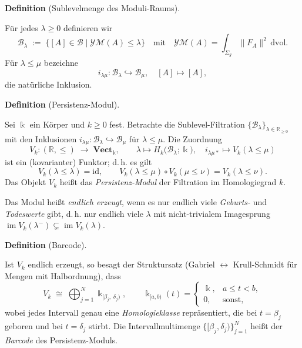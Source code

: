 \documentclass[10pt, letterpaper]{article}
\newcommand{\CustomHeading}[3]{%
  \par\medskip\noindent%
  \textbf{#1 #2} \textnormal{(#3)}.\enskip%
}
\newenvironment{DEF}[2]{\CustomHeading{Definition}{#1}{#2}}{}
\begin{document}
\begin{DEF}{}{Sublevelmenge des Moduli-Raums}
Für jedes \(\lambda\ge 0\) definieren wir
\[
  \mathcal B_\lambda
    \;:=\;
    \bigl\{[A]\in\mathcal B
      \mid
      \mathcal{YM}(A)\le\lambda
    \bigr\}
  \quad\text{mit}\quad
  \mathcal{YM}(A)
  =\int_{\Sigma_g}\!\|F_A\|^2\,\mathrm d\mathrm{vol}.
\]
Für \(\lambda\le\mu\) bezeichne
\[
  i_{\lambda\mu}\colon
    \mathcal B_\lambda\hookrightarrow\mathcal B_\mu,
  \quad
  [A]\mapsto[A],
\]
die natürliche Inklusion.
\end{DEF}


\begin{DEF}{}{Persistenz-Modul}
Sei $\Bbbk$ ein Körper und \(k\ge 0\) fest.  
Betrachte die Sublevel-Filtration \(\{\mathcal B_\lambda\}_{\lambda\in\mathbb R_{\ge0}}\) mit den Inklusionen
\(i_{\lambda\mu}\colon\mathcal B_\lambda\hookrightarrow\mathcal B_\mu\) für \(\lambda\le\mu\). Die Zuordnung
\[
  V_k\colon(\mathbb R,\le)\;\longrightarrow\;\mathbf{Vect}_{\Bbbk},
  \qquad
  \lambda\longmapsto H_k\!\bigl(\mathcal B_\lambda;\Bbbk\bigr), 
  \quad
  i_{\lambda\mu*}\longmapsto V_k(\lambda\le\mu)
\]
ist ein (kovarianter) Funktor; d.\,h. es gilt
\[
  V_k(\lambda\le\lambda)=\mathrm{id},
  \qquad
  V_k(\lambda\le\mu)\circ V_k(\mu\le\nu)=V_k(\lambda\le\nu).
\]
Das Objekt \(V_k\) heißt das \emph{Persistenz-Modul} der Filtration im Homologiegrad \(k\).

Das Modul heißt \emph{endlich erzeugt}, wenn es nur endlich viele \emph{Geburts-} und \emph{Todeswerte} gibt, d.\,h. nur endlich viele \(\lambda\) mit nicht-trivialem Imagesprung
\(\operatorname{im}V_k(\lambda^-)\subsetneq\operatorname{im}V_k(\lambda)\).
\end{DEF}


\begin{DEF}{}{Barcode}
Ist \(V_k\) endlich erzeugt, so besagt der Struktur­satz
(Gabriel \(\leftrightarrow\) Krull-Schmidt für Mengen mit Halbordnung), dass
\[
  V_k\;\cong\;\bigoplus_{j=1}^N \Bbbk_{[\beta_j,\;\delta_j)},
  \qquad
  \Bbbk_{[a,b)}(t)=
  \begin{cases}
    \Bbbk,& a\le t<b,\\
    0,& \text{sonst},
  \end{cases}
\]
wobei jedes Intervall genau eine \emph{Homologieklasse} repräsentiert, die bei
\(t=\beta_j\) geboren und bei \(t=\delta_j\) stirbt.  
Die Intervall­multimenge \(\{[\beta_j,\delta_j)\}_{j=1}^N\) heißt der \emph{Barcode} des Persistenz-Moduls.
\end{DEF}
\end{document}
